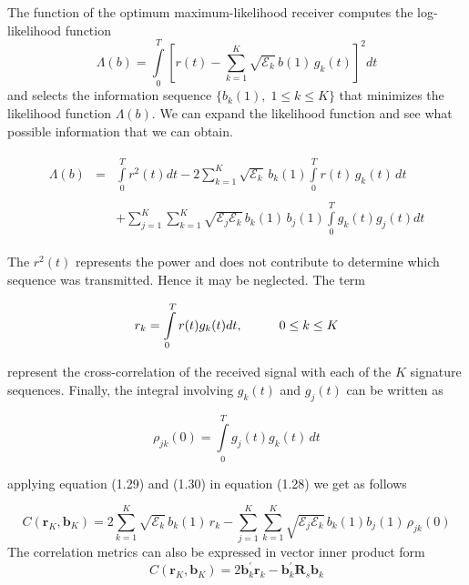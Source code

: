 The function of the optimum maximum-likelihood receiver computes the log-likelihood function
\begin{equation}
\Lambda(b)=\int\limits_{0}^{T}\left [ r(t)-\sum\limits_{k=1}^{K}\sqrt{\mathcal{E}_k}\,b(1)\,g_k(t)\right ]^2 dt
\end{equation}
and selects the information sequence $\{b_k(1),\;1\leq k \leq K\}$ that minimizes the likelihood function $\Lambda(b)$. We can expand the likelihood function and see what possible information that we can obtain.

\begin{eqnarray}
\begin{array}{rrr}
\Lambda(b)&=&\int\limits_{0}^{T}r^2(t)dt-2\sum\limits_{k=1}^{K}\sqrt{\mathcal{E}_k}\,b_k(1)\int\limits_{0}^{T}r(t)\,g_k(t)\,dt \\ \\
&&+\sum\limits_{j=1}^{K}\sum\limits_{k=1}^{K}\sqrt{\mathcal{E}_j\mathcal{E}_k}\,b_k(1)\,b_j(1)\int\limits_{0}^{T}g_k(t)g_j(t)dt
\end{array} 
\end{eqnarray}

The $r^2(t)$ represents the power and does not contribute to determine which sequence was transmitted. Hence it may be neglected. The term

\begin{equation}
r_k=\int\limits_{0}^{T}r(t)g_k(t)dt,\hspace{10mm}0 \leq k\leq K
\end{equation}

represent the cross-correlation of the received signal with each of the $K$ signature sequences. Finally, the integral involving $g_k(t)$ and $g_j(t)$ can be written as

\begin{equation}
\rho_{jk}(0)=\int\limits_{0}^{T}g_j(t)g_k(t)\,dt
\end{equation}

applying equation (1.29) and (1.30) in equation (1.28) we get as follows

\begin{equation}
C(\mathrm{\mathbf{r}}_K,\mathrm{\mathbf{b}}_K)=2\sum\limits_{k=1}^{K}\sqrt{\mathcal{E}_k}\,b_k(1)\,r_k-\sum\limits_{j=1}^{K}\sum\limits_{k=1}^{K}\sqrt{\mathcal{E}_j\mathcal{E}_k}\,b_k(1)b_j(1)\,\rho_{jk}(0)
\end{equation}
The correlation metrics can also be expressed in vector inner product form 
\begin{equation}
C(\mathrm{\mathbf{r}}_K,\mathrm{\mathbf{b}}_K)=2\mathrm{\mathbf{b}}_k^{'}\mathrm{\mathbf{r}}_k -\mathrm{\mathbf{b}}_k^{'} \mathrm{\mathbf{R}}_s\mathrm{\mathbf{b}}_k
\end{equation}

